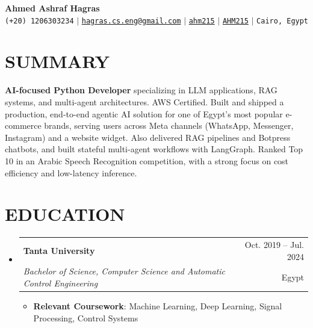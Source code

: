 \documentclass[letterpaper,11pt]{article}
\makeatletter
\newcommand{\resumeItem}[1]{
  \item\small{
    {#1 \vspace{-1pt}}
  }
}
\newcommand{\resumeSubheading}[4]{
  \vspace{-1pt}\item
    \begin{tabular*}{\textwidth}[t]{l@{\extracolsep{\fill}}r}
      \textbf{#1} & {\color{dark-grey}\small #2}\vspace{1pt}\\
      \textit{#3} & {\color{dark-grey} \small #4}\\
    \end{tabular*}\vspace{-4pt}
}
\newcommand{\resumeSubHeadingListStart}{\begin{itemize}[leftmargin=0in, label={}]}
\newcommand{\resumeSubHeadingListEnd}{\end{itemize}}
\newcommand{\resumeItemListStart}{\begin{itemize}}
\newcommand{\resumeItemListEnd}{\end{itemize}\vspace{0pt}}
\makeatother
\begin{document}
\begin{center}
    \textbf{\Huge Ahmed Ashraf Hagras} \\ \vspace{5pt}
    \small \faPhone* \texttt{(+20) 1206303234} \hspace{1pt} $|$
    \hspace{1pt} \faEnvelope \hspace{2pt} \href{mailto:hagras.cs.eng@gmail.com}{\texttt{hagras.cs.eng@gmail.com}} \hspace{1pt} $|$
    \hspace{1pt} \faLinkedin \hspace{2pt} \href{https://www.linkedin.com/in/ahm215}{\texttt{ahm215}} \hspace{1pt} $|$
    \hspace{1pt} \faGithub \hspace{2pt} \href{https://github.com/AHM215}{\texttt{AHM215}} \hspace{1pt} $|$
    \hspace{1pt} \faMapMarker* \hspace{2pt}\texttt{Cairo, Egypt}
    \\ \vspace{-3pt}
\end{center}

\section{SUMMARY}
\small{
\textbf{AI-focused Python Developer} specializing in LLM applications, RAG systems, and multi-agent architectures. AWS Certified. Built and shipped a production, end-to-end agentic AI solution for one of Egypt's most popular e-commerce brands, serving users across Meta channels (WhatsApp, Messenger, Instagram) and a website widget. Also delivered RAG pipelines and Botpress chatbots, and built stateful multi-agent workflows with LangGraph. Ranked Top 10 in an Arabic Speech Recognition competition, with a strong focus on cost efficiency and low-latency inference.
}

\section{EDUCATION}
  \resumeSubHeadingListStart
    \resumeSubheading
      {Tanta University}{Oct. 2019 -- Jul. 2024}
      {Bachelor of Science, Computer Science and Automatic Control Engineering}{Egypt}
      \resumeItemListStart
        \resumeItem{\textbf{Relevant Coursework}: Machine Learning, Deep Learning, Signal Processing, Control Systems}
      \resumeItemListEnd
  \resumeSubHeadingListEnd
\end{document}
